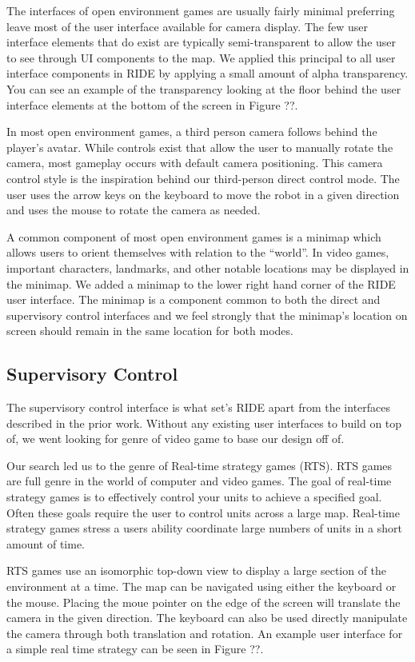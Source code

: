 The interfaces of open environment games are usually fairly minimal preferring leave most of the user interface available for camera display. The few user interface elements that do exist are typically semi-transparent to allow the user to see through UI components to the map. We applied this principal to all user interface components in RIDE by applying a small amount of alpha transparency. You can see an example of the transparency looking at the floor behind the user interface elements at the bottom of the screen in Figure ??. 

In most open environment games, a third person camera follows behind the player's avatar. While controls exist that allow the user to manually rotate the camera, most gameplay occurs with default camera positioning. This camera control style is the inspiration behind our third-person direct control mode. The user uses the arrow keys on the keyboard to move the robot in a given direction and uses the mouse to rotate the camera as needed.

A common component of most open environment games is a minimap which allows users to orient themselves with relation to the ``world''. In video games, important characters, landmarks, and other notable locations may be displayed in the minimap. We added a minimap to the lower right hand corner of the RIDE user interface. The minimap is a component common to both the direct and supervisory control interfaces and we feel strongly that the minimap's location on screen should remain in the same location for both modes.

\subsection{Supervisory Control}

The supervisory control interface is what set's RIDE apart from the interfaces described in the prior work. Without any existing user interfaces to build on top of, we went looking for genre of video game to base our design off of.

Our search led us to the genre of Real-time strategy games (RTS). RTS games are full genre in the world of computer and video games. The goal of real-time strategy games is to effectively control your units to achieve a specified goal. Often these goals require the user to control units across a large  map. Real-time strategy games stress a users ability coordinate large numbers of units in a short amount of time. 

RTS games use an isomorphic top-down view to display a large section of the environment at a time. The map can be navigated using either the keyboard or the mouse. Placing the moue pointer on the edge of the screen will translate the camera in the given direction. The keyboard can also be used directly manipulate the camera through both translation and rotation. An example user interface for a simple real time strategy can be seen in Figure ??. 

